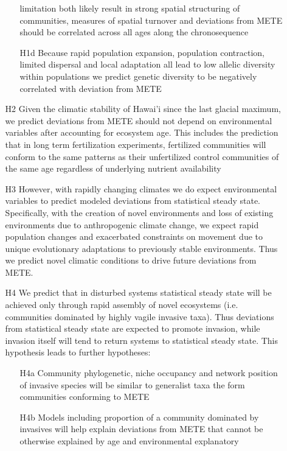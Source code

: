 \documentclass[11pt]{article}
\begin{document}
\begin{itemize}
\begin{itemize}
\begin{itemize}
      limitation both likely result in strong spatial structuring
      of communities, measures of spatial turnover and deviations
      from METE should be correlated across all ages along the
      chronosequence
    \item[H1d] Because rapid population expansion, population
      contraction, limited dispersal and local adaptation all lead
      to low allelic diversity within populations we predict
      genetic diversity to be negatively correlated with deviation
      from METE
    \end{itemize}
  \item[H2] Given the climatic stability of Hawai'i since the last
    glacial maximum, we predict deviations from METE should not depend
    on environmental variables after accounting for ecosystem age.
    This includes the prediction that in long term fertilization
    experiments, fertilized communities will conform to the same
    patterns as their unfertilized control communities of the same age
    regardless of underlying nutrient availability
  \item[H3] However, with rapidly changing climates we do expect
    environmental variables to predict modeled deviations from
    statistical steady state. Specifically, with the creation of novel
    environments and loss of existing environments due to
    anthropogenic climate change, we expect rapid population changes
    and exacerbated constraints on movement due to unique evolutionary
    adaptations to previously stable environments.  Thus we predict
    novel climatic conditions to drive future deviations from METE.
  \item[H4] We predict that in disturbed systems statistical steady
    state will be achieved only through rapid assembly of novel
    ecosystems (i.e. communities dominated by highly vagile invasive
    taxa).  Thus deviations from statistical steady state are expected
    to promote invasion, while invasion itself will tend to return
    systems to statistical steady state.  This hypothesis leads to
    further hypotheses:
    \begin{itemize}
    \item[H4a] Community phylogenetic, niche occupancy and network
      position of invasive species will be similar to generalist taxa
      the form communities conforming to METE
    \item[H4b] Models including proportion of a community dominated by
      invasives will help explain deviations from METE that cannot be
      otherwise explained by age and environmental explanatory

\end{itemize}
\end{itemize}
\end{itemize}
\end{document}
